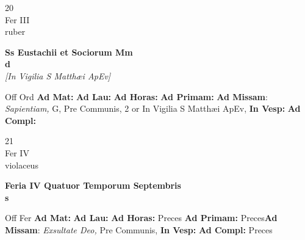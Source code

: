 \documentclass[10pt, openany]{book}
\begin{document}
    \begin{center}
        \begin{minipage}{3.5in}
            \vspace{2em}
            \begin{minipage}{0.5in}
                {\Huge 20} \\
                {\normalsize Fer III} \\
                {\normalsize ruber}
            \end{minipage}
            \begin{minipage}{3.0in}
                \textbf{ \large Ss Eustachii et Sociorum Mm \\
                \textnormal{\normalsize d}} \\ \textit{[In Vigilia S Matthæi ApEv]} \\ 
            \end{minipage}
            \begin{justify}Off Ord
                \textbf{Ad Mat: }
                \textbf{Ad Lau: }
                \textbf{Ad Horas: }
                \textbf{Ad Primam: }\textbf{Ad Missam}: \textit{Sapientiam,} G, Pre Communis, 2 or In Vigilia S Matthæi ApEv,  
                \textbf{In Vesp: }
                \textbf{Ad Compl: }
            \end{justify}
        \end{minipage}
    \end{center}

    \begin{center}
        \begin{minipage}{3.5in}
            \vspace{2em}
            \begin{minipage}{0.5in}
                {\Huge 21} \\
                {\normalsize Fer IV} \\
                {\normalsize violaceus}
            \end{minipage}
            \begin{minipage}{3.0in}
                \textbf{ \large Feria IV Quatuor Temporum Septembris \\
                \textnormal{\normalsize s}} \\ 
            \end{minipage}
            \begin{justify}Off Fer
                \textbf{Ad Mat: }
                \textbf{Ad Lau: }
                \textbf{Ad Horas: }Preces
                \textbf{Ad Primam: }Preces\textbf{Ad Missam}: \textit{Exsultate Deo,} Pre Communis,  
                \textbf{In Vesp: }
                \textbf{Ad Compl: }Preces
            \end{justify}
        \end{minipage}
    \end{center}
\end{document}
